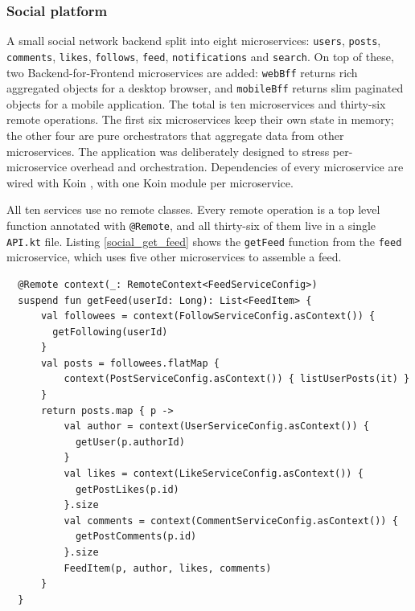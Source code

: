 \documentclass[a4paper,11pt,oneside]{article}
\newcommand{\kotlini}[1]{\texttt{#1}}
\newcommand{\ki}[1]{\kotlini{#1}}
\begin{document}
\subsubsection{Social platform} \label{social_app_section}

A small social network backend split into eight microservices: \kotlini{users}, \kotlini{posts},
\kotlini{comments}, \kotlini{likes}, \kotlini{follows}, \kotlini{feed},
\kotlini{notifications} and \kotlini{search}. On top of these, two Backend-for-Frontend
microservices are added: \kotlini{webBff} returns rich aggregated objects for a desktop browser,
and \kotlini{mobileBff} returns slim paginated objects for a mobile application. The total is ten
microservices and thirty-six remote operations. The first six microservices keep their own state
in memory; the other four are pure orchestrators that aggregate data from other microservices.
The application was deliberately designed to stress per-microservice overhead and orchestration.
Dependencies of every microservice are wired with Koin \cite{noauthor_koin_nodate}, with one Koin
module per microservice.

All ten services use no remote classes. Every remote operation is a top level function annotated
with \kotlini{@Remote}, and all thirty-six of them live in a single \kotlini{API.kt} file.
Listing \ref{social_get_feed} shows the \ki{getFeed} function from the \kotlini{feed}
microservice, which uses five other microservices to assemble a feed.

\begin{listing}[!h]
  \begin{verbatim}
  @Remote context(_: RemoteContext<FeedServiceConfig>)
  suspend fun getFeed(userId: Long): List<FeedItem> {
      val followees = context(FollowServiceConfig.asContext()) { 
        getFollowing(userId) 
      }
      val posts = followees.flatMap {
          context(PostServiceConfig.asContext()) { listUserPosts(it) }
      }
      return posts.map { p ->
          val author = context(UserServiceConfig.asContext()) { 
            getUser(p.authorId) 
          }
          val likes = context(LikeServiceConfig.asContext()) { 
            getPostLikes(p.id) 
          }.size
          val comments = context(CommentServiceConfig.asContext()) { 
            getPostComments(p.id) 
          }.size
          FeedItem(p, author, likes, comments)
      }
  }
  \end{verbatim}
  \caption{Service-to-service orchestration in social platform}\label{social_get_feed}
\end{listing}
\end{document}
